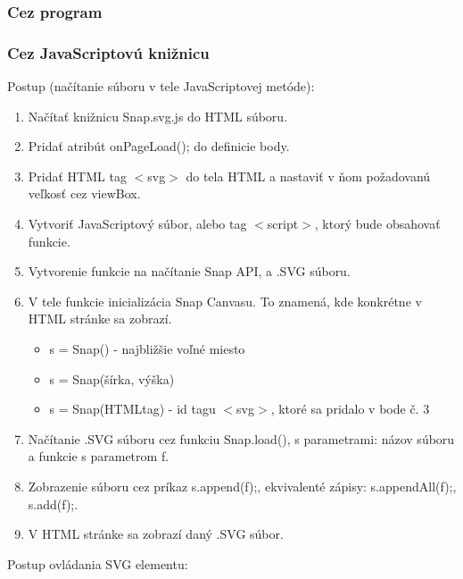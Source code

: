  \subsubsection{Cez program}
 
 \subsubsection{Cez JavaScriptovú knižnicu}

Postup (načítanie súboru v tele JavaScriptovej metóde): 
\begin{enumerate}
	\item Načítať knižnicu Snap.svg.js do HTML súboru. 
	\item Pridať atribút onPageLoad(); do definicie body.
	\item Pridať HTML tag $<$svg$>$ do tela HTML a nastaviť v ňom požadovanú veľkosť cez viewBox.
	\item Vytvoriť JavaScriptový súbor, alebo tag $<$script$>$, ktorý bude obsahovať funkcie. 
	\item Vytvorenie funkcie na načítanie Snap API, a .SVG súboru. 
	\item V tele funkcie inicializácia Snap Canvasu. To znamená, kde konkrétne v HTML stránke sa zobrazí.
	\begin{itemize}
		\item s = Snap() - najbližšie voľné miesto
		\item s = Snap(šírka, výška) 
		\item s = Snap(HTMLtag) - id tagu $<$svg$>$, ktoré sa pridalo v bode č. 3
	\end{itemize}
	\item Načítanie .SVG súboru cez funkciu Snap.load(), s parametrami: názov súboru a funkcie s parametrom f. 
	\item Zobrazenie súboru cez príkaz s.append(f);, ekvivalenté zápisy: s.appendAll(f);, s.add(f);. 
	\item V HTML stránke sa zobrazí daný .SVG súbor. 
	
	
\end{enumerate}

Postup ovládania SVG elementu:

